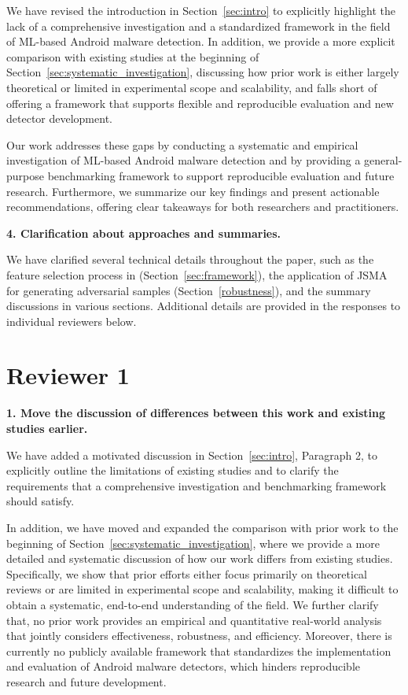 We have revised the introduction in Section~\ref{sec:intro} to explicitly highlight the lack of a comprehensive investigation and a standardized framework in the field of ML-based Android malware detection. In addition, we provide a more explicit comparison with existing studies at the beginning of Section~\ref{sec:systematic_investigation}, discussing how prior work is either largely theoretical or limited in experimental scope and scalability, and falls short of offering a framework that supports flexible and reproducible evaluation and new detector development.

Our work addresses these gaps by conducting a systematic and empirical investigation of ML-based Android malware detection and by providing a general-purpose benchmarking framework to support reproducible evaluation and future research. Furthermore, we summarize our key findings and present actionable recommendations, offering clear takeaways for both researchers and practitioners.

\vspace{0.1cm}
\noindent \textbf{4. Clarification about approaches and summaries.}

We have clarified several technical details throughout the paper, such as the feature selection process in \codename (Section~\ref{sec:framework}), the application of JSMA for generating adversarial samples (Section~\ref{robustness}), and the summary discussions in various sections. Additional details are provided in the responses to individual reviewers below.

\newpage
\section*{Reviewer 1}

\noindent \textbf{1. Move the discussion of differences between this work and existing studies earlier.}

We have added a motivated discussion in Section~\ref{sec:intro}, Paragraph 2, to explicitly outline the limitations of existing studies and to clarify the requirements that a comprehensive investigation and benchmarking framework should satisfy.

In addition, we have moved and expanded the comparison with prior work to the beginning of Section~\ref{sec:systematic_investigation}, where we provide a more detailed and systematic discussion of how our work differs from existing studies. Specifically, we show that prior efforts either focus primarily on theoretical reviews or are limited in experimental scope and scalability, making it difficult to obtain a systematic, end-to-end understanding of the field. We further clarify that, no prior work provides an empirical and quantitative real-world analysis that jointly considers effectiveness, robustness, and efficiency. Moreover, there is currently no publicly available framework that standardizes the implementation and evaluation of Android malware detectors, which hinders reproducible research and future development.

